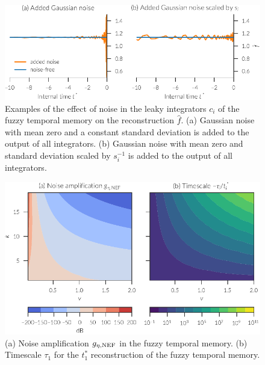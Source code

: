 \begin{figure}
    \centering
    \includegraphics{figures/fuzzy-mem-noise-example}
    \caption[Example of the effect of noise on the fuzzy temporal memory]{Examples of the effect of noise in the leaky integrators $c_i$ of the fuzzy temporal memory on the reconstruction $\hat{f}$. (a) Gaussian noise with mean zero and a constant standard deviation is added to the output of all integrators. (b) Gaussian noise with mean zero and standard deviation scaled by $s_i^{-1}$ is added to the output of all integrators.}\label{fig:fuzzy-mem-noise-example}
\end{figure}
\begin{figure}
    \centering
    \includegraphics{figures/fuzzy-mem-noise-ts}
    \caption[Noise amplification and timescales in fuzzy temporal memory]{(a) Noise amplification $g_{\eta,{\mathrm{NEF}}}$ in the fuzzy temporal memory. (b) Timescale $\tau_1$ for the $t^*_1$ reconstruction of the fuzzy temporal memory.}\label{fig:fuzzy-mem-noise-ts}
\end{figure}

